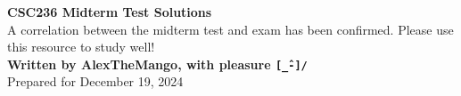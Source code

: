 \begin{titlepage}
    \null %
    \vfill
    \begin{center}
        {\fontsize{40}{48}\selectfont \bfseries CSC236 Midterm Test Solutions}
        \vspace{20pt} \\
        {\LARGE A correlation between the midterm test and exam has been confirmed. Please use this resource to study well!} \\
        \vspace{20pt}
        \textbf{Written by AlexTheMango, with pleasure \texttt{[\^\_-]/}}
        \vspace{8pt}
        \\ Prepared for December 19, 2024
    \end{center}
    \vfill
\end{titlepage}

